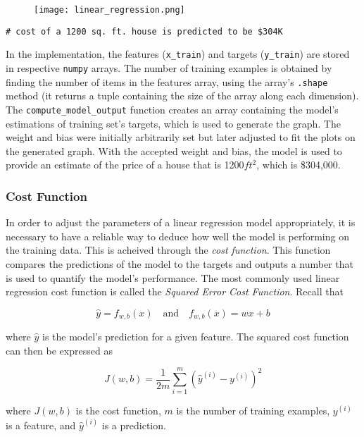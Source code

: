 \documentclass{article}
\begin{document}
\begin{figure}
\centering
\texttt{[image: linear\_regression.png]}
\end{figure}

\begin{lstlisting}[caption={Code Output}]
# cost of a 1200 sq. ft. house is predicted to be $304K
\end{lstlisting}

\noindent In the implementation, the features (\texttt{x\_train}) and targets (\texttt{y\_train}) are stored in respective \texttt{numpy} arrays. The number of training examples is obtained by finding the number of items in the features array, using the array's \texttt{.shape} method (it returns a tuple containing the size of the array along each dimension). The \texttt{compute\_model\_output} function creates an array containing the model's estimations of training set's targets, which is used to generate the graph. The weight and bias were initially arbitrarily set but later adjusted to fit the plots on the generated graph. With the accepted weight and bias, the model is used to provide an estimate of the price of a house that is 1200$ft^2$, which is \$304,000.

\subsubsection{Cost Function}
In order to adjust the parameters of a linear regression model appropriately, it is necessary to have a reliable way to deduce how well the model is performing on the training data. This is acheived through the \textit{cost function}. This function compares the predictions of the model to the targets and outputs a number that is used to quantify the model's performance. The most commonly used linear regression cost function is called the \textit{Squared Error Cost Function}. Recall that

\[
\hat{y} =  f_{w, b}(x) \quad \textrm{and} \quad f_{w, b}(x) = wx + b
\]

\noindent where $\hat{y}$ is the model's prediction for a given feature. The squared cost function can then be expressed as

\[ J(w, b) = \frac{1}{2m}\sum^{m}_{i = 1}{ ({ \hat{y}^{(i)} - y^{(i)} })^2 }\]

\noindent where $J(w, b)$ is the cost function, $m$ is the number of training examples, $y^{(i)}$ is a feature, and $\hat{y}^{(i)}$ is a prediction.
\end{document}
